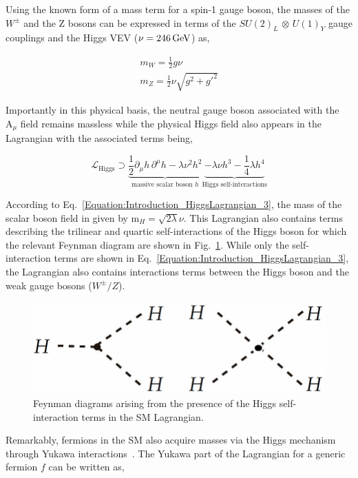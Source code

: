 Using the known form of a mass term for a spin-1 gauge boson, the masses of the $W^\pm$ and the Z bosons can be expressed in terms of the $SU(2)_{L}$ $\otimes$ $U(1)_{Y}$ gauge couplings and the Higgs VEV ($\nu = 246 \,\text{Ge\hspace{-.08em}V}$) as,

\begin{equation}
\begin{array}{c}
    m_W = \frac{1}{2}g\nu \\
    m_Z = \frac{1}{2}\nu\sqrt{g^2+g'^2}
\end{array}
\end{equation}

Importantly in this physical basis, the neutral gauge boson associated with the $\text{A}_\mu$ field remains massless while the physical Higgs field also appears in the Lagrangian with the associated terms being,

\begin{equation}
    \mathcal{L}_{\text{Higgs}} \supset \underbrace{\frac{1}{2} \partial_\mu h \, \partial^\mu h - \lambda \nu^2 h^2}_{\text{massive scalar boson } h}
    \underbrace{- \lambda \nu h^3 - \frac{1}{4} \lambda h^4}_{\text{Higgs self-interactions}}
\label{Equation:Introduction_HiggsLagrangian_3}
\end{equation}

According to Eq.~\ref{Equation:Introduction_HiggsLagrangian_3}, the mass of the scalar boson field in given by $\text{m}_H = \sqrt{2\lambda}\nu$. This Lagrangian also contains terms describing the trilinear and quartic self-interactions of the Higgs boson for which the relevant Feynman diagram are shown in Fig.~\ref{Figure:Introduction_HiggsSelf}. While only the self-interaction terms are shown in Eq.~\ref{Equation:Introduction_HiggsLagrangian_3}, the Lagrangian also contains interactions terms between the Higgs boson and the weak gauge bosons ($W^\pm/Z$). 

\begin{figure}[h]
\centering
\includegraphics[width= .5\textwidth]{Figures/Introduction/HiggsSelfInt.png}
\caption{Feynman diagrams arising from the presence of the Higgs self-interaction terms in the SM Lagrangian.}
\label{Figure:Introduction_HiggsSelf}
\end{figure}

Remarkably, fermions in the SM also acquire masses via the Higgs mechanism through Yukawa interactions~\cite{YukawaInteractions}. The Yukawa part of the Lagrangian for a generic fermion $f$ can be written as,


